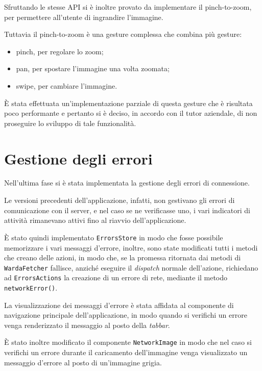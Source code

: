 Sfruttando le stesse API si è inoltre provato da implementare il pinch-to-zoom, per permettere all'utente di ingrandire l'immagine.

Tuttavia il pinch-to-zoom è una gesture complessa che combina più gesture:
\begin{itemize}
\item pinch, per regolare lo zoom;
\item pan, per spostare l'immagine una volta zoomata;
\item swipe, per cambiare l'immagine.
\end{itemize}

\`E stata effettuata un'implementazione parziale di questa gesture che è risultata poco performante e pertanto si è deciso, in accordo con il tutor aziendale, di non proseguire lo sviluppo di tale funzionalità.

\section{Gestione degli errori}

Nell'ultima fase si è stata implementata la gestione degli errori di connessione.

Le versioni precedenti dell'applicazione, infatti, non gestivano gli errori di comunicazione con il server, e nel caso se ne verificasse uno, i vari indicatori di attività rimanevano attivi fino al riavvio dell'applicazione.

\`E stato quindi implementato \texttt{ErrorsStore} in modo che fosse possibile memorizzare i vari messaggi d'errore, inoltre, sono state modificati tutti i metodi che creano delle azioni, in modo che, se la promessa ritornata dai metodi di \texttt{WardaFetcher} fallisce, anziché eseguire il \textit{dispatch} normale dell'azione, richiedano ad \texttt{ErrorsActions} la creazione di un errore di rete, mediante il metodo \texttt{networkError()}.

La visualizzazione dei messaggi d'errore è stata affidata al componente di navigazione principale dell'applicazione, in modo quando si verifichi un errore venga renderizzato il messaggio al posto della \textit{tabbar}.

\`E stato inoltre modificato il componente \texttt{NetworkImage} in modo che nel caso si verifichi un errore durante il caricamento dell'immagine venga visualizzato un messaggio d'errore al posto di un'immagine grigia.
